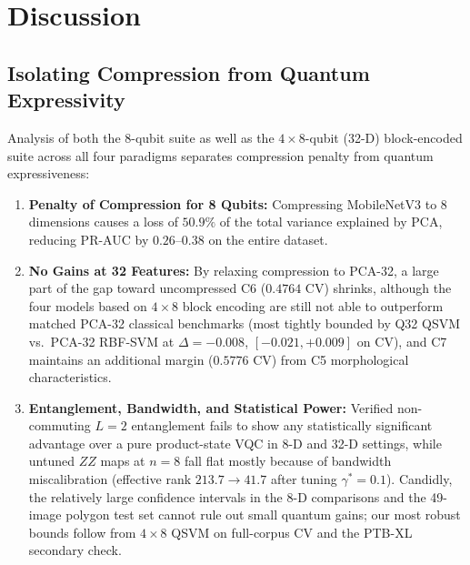 \documentclass[conference]{IEEEtran}
\begin{document}
\section{Discussion}

\subsection{Isolating Compression from Quantum Expressivity}
Analysis of both the 8-qubit suite as well as the $4 \times 8$-qubit (32-D) block-encoded suite across all four paradigms separates compression penalty from quantum expressiveness:
\begin{enumerate}
    \item \textbf{Penalty of Compression for 8 Qubits:} Compressing MobileNetV3 to 8 dimensions causes a loss of $50.9\%$ of the total variance explained by PCA, reducing PR-AUC by $0.26$--$0.38$ on the entire dataset.
    \item \textbf{No Gains at 32 Features:} By relaxing compression to PCA-32, a large part of the gap toward uncompressed C6 ($0.4764$ CV) shrinks, although the four models based on $4 \times 8$ block encoding are still not able to outperform matched PCA-32 classical benchmarks (most tightly bounded by Q32 QSVM vs.\ PCA-32 RBF-SVM at $\Delta = -0.008$, $[-0.021, +0.009]$ on CV), and C7 maintains an additional margin ($0.5776$ CV) from C5 morphological characteristics.
    \item \textbf{Entanglement, Bandwidth, and Statistical Power:} Verified non-commuting $L=2$ entanglement fails to show any statistically significant advantage over a pure product-state VQC in 8-D and 32-D settings, while untuned $ZZ$ maps at $n=8$ fall flat mostly because of bandwidth miscalibration (effective rank $213.7 \to 41.7$ after tuning $\gamma^*=0.1$). Candidly, the relatively large confidence intervals in the 8-D comparisons and the 49-image polygon test set cannot rule out small quantum gains; our most robust bounds follow from $4 \times 8$ QSVM on full-corpus CV and the PTB-XL secondary check.
\end{enumerate}
\end{document}
